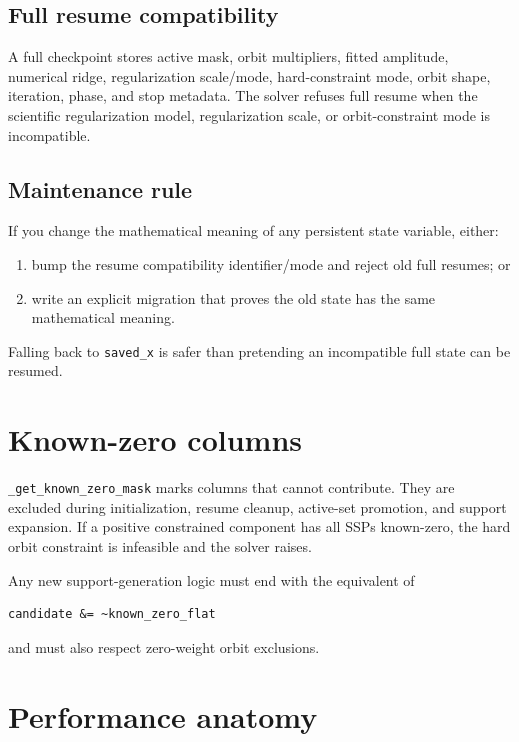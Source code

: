 \documentclass[10pt,a4paper]{article}
\newcommand{\code}[1]{\texttt{#1}}
\begin{document}
\subsection{Full resume compatibility}
A full checkpoint stores active mask, orbit multipliers, fitted amplitude, numerical ridge, regularization scale/mode, hard-constraint mode, orbit shape, iteration, phase, and stop metadata. The solver refuses full resume when the scientific regularization model, regularization scale, or orbit-constraint mode is incompatible.

\subsection{Maintenance rule}
If you change the mathematical meaning of any persistent state variable, either:
\begin{enumerate}
\item bump the resume compatibility identifier/mode and reject old full resumes; or
\item write an explicit migration that proves the old state has the same mathematical meaning.
\end{enumerate}
Falling back to \code{saved\_x} is safer than pretending an incompatible full state can be resumed.

\section{Known-zero columns}
\code{\_get\_known\_zero\_mask} marks columns that cannot contribute. They are excluded during initialization, resume cleanup, active-set promotion, and support expansion. If a positive constrained component has all SSPs known-zero, the hard orbit constraint is infeasible and the solver raises.

Any new support-generation logic must end with the equivalent of
\begin{lstlisting}
candidate &= ~known_zero_flat
\end{lstlisting}
and must also respect zero-weight orbit exclusions.

\section{Performance anatomy}
\end{document}
